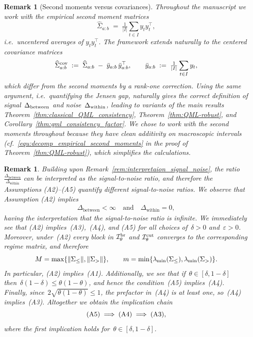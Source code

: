 \documentclass[10pt, letterpaper]{amsart}
\newtheorem{remark}[theorem]{Remark}
\def\min{{\rm min}}
\begin{document}
\begin{remark}[Second moments versus covariances]\label{rem:second_moment_vs_covariance}
Throughout the manuscript we work with the empirical \emph{second moment} matrices
\[
\widehat\Sigma_{a:b} \;=\; \tfrac{1}{|I|}\sum_{t\in I}y_t y_t^{\top},
\]
i.e.~uncentered averages of $y_t y_t^{\top}$. The framework extends naturally to the centered \emph{covariance} matrices
\[
\widehat\Sigma_{a:b}^{\rm cov} \;:=\; \widehat\Sigma_{a:b} \;-\; \bar y_{a:b}\,\bar y_{a:b}^{\top},
\qquad
\bar y_{a:b} \;:=\; \tfrac{1}{|I|}\sum_{t\in I}y_t,
\]
which differ from the second moments by a rank-one correction. Using the same argument, i.e.~quantifying the Jensen gap, naturally gives the correct definition of signal~$\Delta_{\rm between}$ and noise~$\Delta_{\rm within}$, leading to variants of the main results Theorem~\ref{thm:classical_QML_consistency}, Theorem~\ref{thm:QML-robust}, and Corollary~\ref{thm:qml_consistency_factor}. We chose to work with the second moments throughout because they have clean additivity on macroscopic intervals (cf.~\eqref{equ:decomp_empirical_second_moments} in the proof of Theorem~\ref{thm:QML-robust}), which simplifies the calculations.
\end{remark}

\begin{remark}\label{rem:assumptions_as_signal_to_noise_ratios}
Building upon Remark~\ref{rem:interpretaion_signal_noise}, the ratio~$\frac{\Delta_{\text{between}}}{\Delta_{\text{within}}}$ can be interpreted as the signal-to-noise ratio, and therefore the Assumptions (A2)--(A5) quantify different signal-to-noise ratios. We observe that Assumption (A2) implies 
\begin{align}
\Delta_{\text{between}}< \infty \quad \mbox{and} \quad \Delta_{\text{within}} =0,
\end{align}
having the interpretation that the signal-to-noise ratio is infinite. We immediately see that (A2) implies~(A3),~(A4), and (A5) for all choices of~$\delta>0$ and~$\varepsilon>0$. Moreover, under~(A2) every block in $\mathcal I_{\theta}^{\rm br}$ and $\mathcal I_{\theta}^{\rm cut}$ converges to the corresponding regime matrix, and therefore
\[
M=\max\{\|\Sigma_{\leq}\|,\|\Sigma_{>}\|\},
\qquad
m=\min\{\lambda_{\min}(\Sigma_{\leq}),\lambda_{\min}(\Sigma_{>})\}.
\]
In particular, (A2) implies~(A1). Additionally, we see that if~$\theta \in [\delta, 1 - \delta]$ then~$\delta(1-\delta) \leq \theta(1-\theta)$, and hence the condition~(A5) implies~(A4). Finally, since~$2\sqrt{\theta(1-\theta)} \leq 1$, the prefactor in~(A4) is at least one, so~(A4) implies~(A3). Altogether we obtain the implication chain
\[
    \textup{(A5)}\implies \textup{(A4)}\implies \textup{(A3)},
\]
where the first implication holds for~$\theta \in [\delta, 1-\delta]$.
\end{remark}
\end{document}
